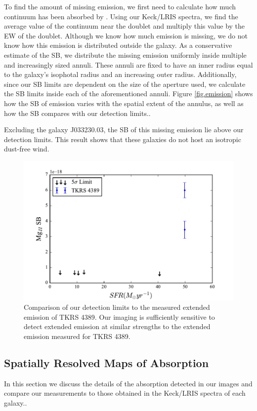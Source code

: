 \documentclass[twocolumn]{aastex61}
\begin{document}
To find the amount of missing emission, we first need to calculate how much continuum has been absorbed by . Using our Keck/LRIS spectra, we find the average value of the continuum near the  doublet and multiply this value by the EW of the doublet. Although we know how much emission is missing, we do not know how this emission is distributed outside the galaxy. As a conservative estimate of the SB, we distribute the missing emission uniformly inside multiple and increasingly sized annuli. These annuli are fixed to have an inner radius equal to the galaxy's isophotal radius and an increasing outer radius.  Additionally, since our SB limits are dependent on the size of the aperture used, we calculate the SB limits inside each of the aforementioned annuli. Figure \ref{fig.emission} shows how the SB of emission varies with the spatial extent of the annulus, as well as how the SB compares with our detection limits.. 

Excluding the galaxy J033230.03, the SB of this missing emission lie above our detection limits. This result shows that these galaxies do not host an isotropic dust-free wind.


\begin{figure}[!htb]
\centering
\includegraphics[scale=0.6]{../Figures/limits.pdf}
\caption{Comparison of our detection limits to the measured extended emission of TKRS 4389. Our imaging is sufficiently sensitive to detect extended emission at similar strengths to the extended emission measured for TKRS 4389.}
\label{fig:detection_lim}
\end{figure}

\subsection{Spatially Resolved Maps of  Absorption}
In this section we discuss the details of the absorption detected in our images and compare our measurements to those obtained in the Keck/LRIS spectra of each galaxy.. 
\end{document}
